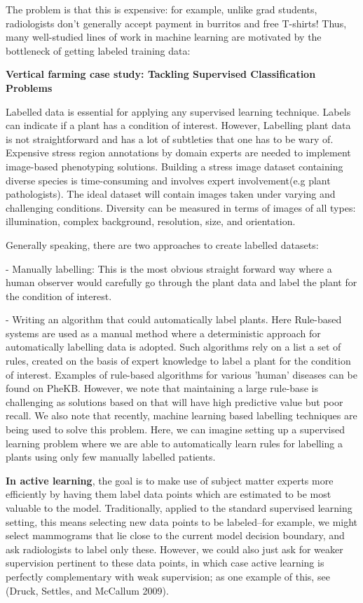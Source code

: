 \documentclass[openany]{book}
\begin{document}
The problem is that this is expensive: for example, unlike grad students, radiologists don’t generally accept payment in burritos and free T-shirts! Thus, many well-studied lines of work in machine learning are motivated by the bottleneck of getting labeled training data:



\textbf{Vertical farming case study: Tackling Supervised Classification Problems}


Labelled data is essential for applying any supervised learning technique. Labels can indicate if a plant has a condition of interest. However, Labelling plant data is not straightforward and has a lot of subtleties that one has to be wary of. Expensive stress region annotations by domain experts are needed to implement image-based phenotyping solutions.  Building a stress image dataset containing diverse species is time-consuming and involves expert involvement(e.g plant pathologists). The ideal dataset will contain images taken under varying and challenging conditions. Diversity can be measured in terms of images of all types: illumination, complex background, resolution, size, and orientation. 

Generally speaking, there are two approaches to create labelled datasets:

- Manually labelling:  This is the most obvious straight forward way where a human observer would carefully go through the plant data and label the plant for the condition of interest.

- Writing an algorithm that could automatically label plants. Here Rule-based systems are used as a manual method where a deterministic approach for automatically labelling data is adopted. Such algorithms rely on a list a set of rules, created on the basis of expert knowledge to label a plant for the condition of interest. Examples of rule-based algorithms for various 'human' diseases can be found on PheKB. However, we note that maintaining a large rule-base is challenging as solutions based on that will have high predictive value but poor recall. We also note that recently, machine learning based labelling techniques are being used to solve this problem. Here, we can imagine setting up a supervised learning problem where we are able to automatically learn rules for labelling a plants using only few manually labelled patients.


\textbf{In active learning}, the goal is to make use of subject matter experts more efficiently by having them label data points which are estimated to be most valuable to the model. Traditionally, applied to the standard supervised learning setting, this means selecting new data points to be labeled–for example, we might select mammograms that lie close to the current model decision boundary, and ask radiologists to label only these. However, we could also just ask for weaker supervision pertinent to these data points, in which case active learning is perfectly complementary with weak supervision; as one example of this, see (Druck, Settles, and McCallum 2009).
\end{document}
